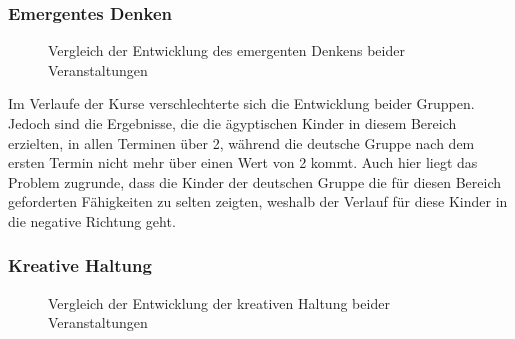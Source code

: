 \subsubsection{Emergentes Denken}
\begin{figure}[H]
	\centering
	\caption[Vergleich Entwicklung emergentes Denken beider Veranstaltungen]{Vergleich der Entwicklung des emergenten Denkens beider Veranstaltungen}
\end{figure}
Im Verlaufe der Kurse verschlechterte sich die Entwicklung beider Gruppen. Jedoch sind die Ergebnisse, die die ägyptischen Kinder in diesem Bereich erzielten, in allen Terminen über 2, während die deutsche Gruppe nach dem ersten Termin nicht mehr über einen Wert von 2 kommt. Auch hier liegt das Problem zugrunde, dass die Kinder der deutschen Gruppe die für diesen Bereich geforderten Fähigkeiten zu selten zeigten, weshalb der Verlauf für diese Kinder in die negative Richtung geht.


\subsubsection{Kreative Haltung}
\begin{figure}[H]
	\centering
	\caption[Vergleich Entwicklung kreative Haltung beider Veranstaltungen]{Vergleich der Entwicklung der kreativen Haltung beider Veranstaltungen}
	\label{comparingCreativity}
\end{figure}

